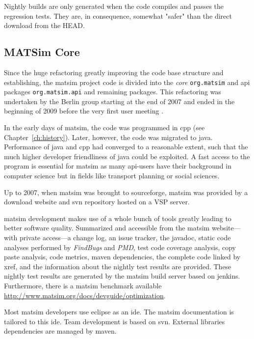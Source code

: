 Nightly builds are only generated when the code compiles and passes the regression tests.  They are, in consequence, somewhat "safer" than the direct download from the HEAD.

\subsection{MATSim Core}
Since the huge refactoring greatly improving the code base structure and establishing, the \gls{matsim} project code is divided into the \emph{core} \lstinline|org.matsim| and \gls{api} packages \lstinline|org.matsim.api| and remaining packages. This refactoring was undertaken by the Berlin group starting at the end of 2007 and ended in the beginning of 2009 before the very first user meeting .

In the early days of \gls{matsim}, the code was programmed in \gls{cpp} (see Chapter~\ref{ch:history}). Later, however, the code was migrated to \gls{java}. Performance of \gls{java} and \gls{cpp} had converged to a reasonable extent, such that the much higher developer friendliness of \gls{java} could be exploited. A fast access to the program is essential for \gls{matsim} as many \gls{api}-users have their background in computer science but in fields like transport planning or social sciences. 

Up to 2007, when \gls{matsim} was brought to \gls{sourceforge}, \gls{matsim} was provided by a download website and \gls{svn} repository hosted on a VSP server.

\gls{matsim} development makes use of a whole bunch of tools greatly leading to better software quality. Summarized and accessible from the \gls{matsim} website---with private access---a change log, an issue tracker, the \gls{javadoc}, static code analyses performed by \emph{FindBugs} and \emph{PMD}, test code coverage analysis, copy paste analysis, code metrics, \gls{maven} dependencies, the complete code linked by \gls{xref}, and the information about the nightly test results are provided. These nightly test results are generated by the \gls{matsim} build server based on \gls{jenkins}. Furthermore, there is a \gls{matsim} benchmark available \url{http://www.matsim.org/docs/devguide/optimization}.

Most \gls{matsim} developers use \gls{eclipse} as an \gls{ide}. The \gls{matsim} documentation is tailored to this \gls{ide}. Team development is based on \gls{svn}. External libraries dependencies are managed by \gls{maven}. 

